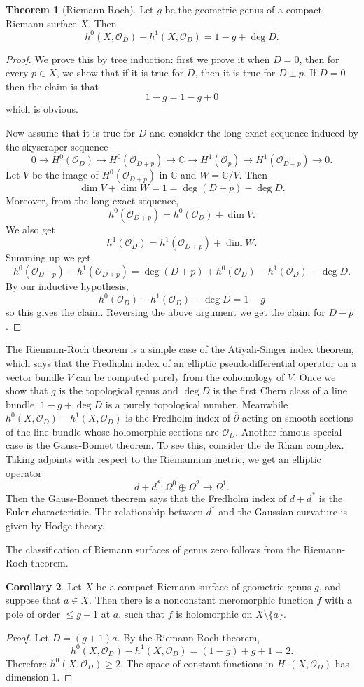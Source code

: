 \documentclass[12pt]{book}
\newcommand{\CC}{\mathbb{C}}
\newcommand{\Olo}{\mathscr O}
\newcommand{\dbar}{\overline\partial}
\theoremstyle{definition}
\newtheorem{theorem}{Theorem}[chapter]
\newtheorem{corollary}[theorem]{Corollary}
\begin{document}
\begin{theorem}[Riemann-Roch]
Let $g$ be the geometric genus of a compact Riemann surface $X$. Then
$$h^0(X, \Olo_D) - h^1(X, \Olo_D) = 1 - g + \deg D.$$
\end{theorem}
\begin{proof}
We prove this by tree induction: first we prove it when $D = 0$, then for every $p \in X$, we show that if it is true for $D$, then it is true for $D \pm p$.
If $D = 0$ then the claim is that
$$1 - g = 1 - g + 0$$
which is obvious.

Now assume that it is true for $D$ and consider the long exact sequence induced by the skyscraper sequence
$$0 \to H^0(\Olo_D) \to H^0(\Olo_{D+p}) \to \CC \to H^1(\Olo_p) \to H^1(\Olo_{D+p}) \to 0.$$
Let $V$ be the image of $H^0(\Olo_{D+p})$ in $\CC$ and $W = \CC/V$.
Then
$$\dim V + \dim W = 1 = \deg(D+p) - \deg D.$$
Moreover, from the long exact sequence,
$$h^0(\Olo_{D+p}) = h^0(\Olo_D) + \dim V.$$
We also get
$$h^1(\Olo_D) = h^1(\Olo_{D+p}) + \dim W.$$
Summing up we get
$$h^0(\Olo_{D + p}) - h^1(\Olo_{D + p}) = \deg(D+p) + h^0(\Olo_D) - h^1(\Olo_D) - \deg D.$$
By our inductive hypothesis,
$$h^0(\Olo_D) - h^1(\Olo_D) - \deg D = 1 - g$$
so this gives the claim.
Reversing the above argument we get the claim for $D - p$.
\end{proof}

The Riemann-Roch theorem is a simple case of the Atiyah-Singer index theorem, which says that the Fredholm index of an elliptic pseudodifferential operator on a vector bundle $V$ can be computed purely from the cohomology of $V$.
Once we show that $g$ is the topological genus and $\deg D$ is the first Chern class of a line bundle, $1 - g + \deg D$ is a purely topological number.
Meanwhile $h^0(X, \Olo_D) - h^1(X, \Olo_D)$ is the Fredholm index of $\dbar$ acting on smooth sections of the line bundle whose holomorphic sections are $\Olo_D$.
Another famous special case is the Gauss-Bonnet theorem.
To see this, consider the de Rham complex. Taking adjoints with respect to the Riemannian metric, we get an elliptic operator
$$d + d^*: \Omega^0 \oplus \Omega^2 \to \Omega^1.$$
Then the Gauss-Bonnet theorem says that the Fredholm index of $d + d^*$ is the Euler characteristic.
The relationship between $d^*$ and the Gaussian curvature is given by Hodge theory.

The classification of Riemann surfaces of genus zero follows from the Riemann-Roch theorem.

\begin{corollary}
Let $X$ be a compact Riemann surface of geometric genus $g$, and suppose that $a \in X$.
Then there is a nonconstant meromorphic function $f$ with a pole of order $\leq g + 1$ at $a$, such that $f$ is holomorphic on $X \setminus \{a\}$.
\end{corollary}
\begin{proof}
Let $D = (g+1)a$.
By the Riemann-Roch theorem,
$$h^0(X, \Olo_D) - h^1(X, \Olo_D) = (1 - g) + g + 1 = 2.$$
Therefore $h^0(X, \Olo_D) \geq 2$.
The space of constant functions in $H^0(X, \Olo_D)$ has dimension $1$.
\end{proof}
\end{document}
